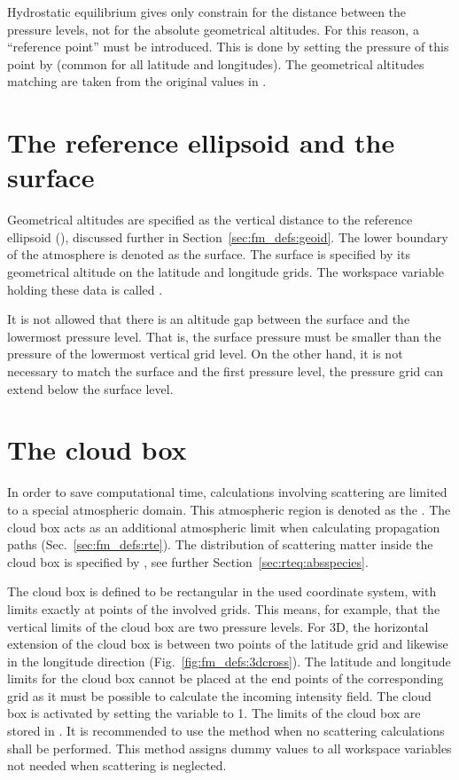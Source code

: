 Hydrostatic equilibrium gives only constrain for the distance between the
pressure levels, not for the absolute geometrical altitudes. For this reason, a
``reference point'' must be introduced. This is done by setting the pressure of
this point by  (common for all latitude and longitudes). The
geometrical altitudes matching  are taken from the original
values in . 


\section{The reference ellipsoid and the surface}
\label{sec:fm_defs:surf}

Geometrical altitudes are specified as the vertical distance to the reference
ellipsoid (), discussed further in
Section~\ref{sec:fm_defs:geoid}. The lower boundary of the atmosphere is
denoted as the surface. The surface is specified by its geometrical altitude on
the latitude and longitude grids. The workspace variable holding these data is
called .

It is not allowed that there is an altitude gap between the surface and
the lowermost pressure level.  That is, the surface pressure must be
smaller than the pressure of the lowermost vertical grid level. On
the other hand, it is not necessary to match the surface and the first
pressure level, the pressure grid can extend below the surface level.


\section{The cloud box}
\label{sec:fm_defs:cloudbox}
In order to save computational time, calculations involving scattering are
limited to a special atmospheric domain. This atmospheric region is denoted as
the . The cloud box acts as an additional atmospheric
limit when calculating propagation paths (Sec.~\ref{sec:fm_defs:rte}).
The distribution of scattering matter inside the cloud box is specified by
, see further Section~\ref{sec:rteq:absspecies}.

The cloud box is defined to be rectangular in the used coordinate
system, with limits exactly at points of the involved grids. This
means, for example, that the vertical limits of the cloud box are two
pressure levels. For 3D, the horizontal extension of the cloud box
is between two points of the latitude grid and likewise in the
longitude direction (Fig.~\ref{fig:fm_defs:3dcross}). The latitude
and longitude limits for the cloud box cannot be placed at the end
points of the corresponding grid as it must be possible to calculate
the incoming intensity field. The cloud box is activated by setting
the variable  to 1.  The limits of the cloud
box are stored in .  It is recommended to
use the method  when no scattering calculations
shall be performed. This method assigns dummy values to all workspace
variables not needed when scattering is neglected.


